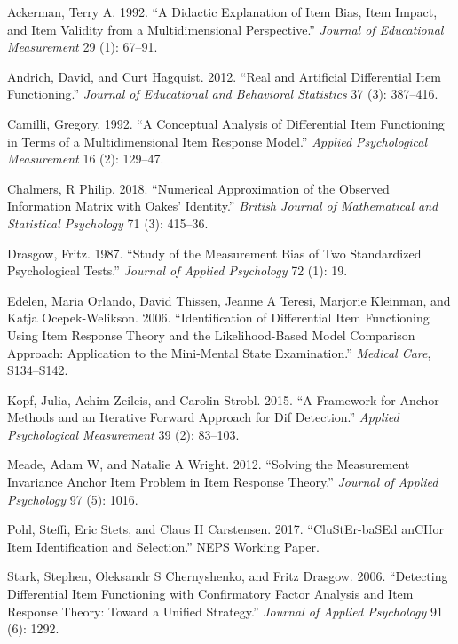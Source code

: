 \documentclass[
  11pt,
]{article}
\begin{document}
\hypertarget{refs}{}
\leavevmode\hypertarget{ref-ackerman1992didactic}{}%
Ackerman, Terry A. 1992. ``A Didactic Explanation of Item Bias, Item Impact, and Item Validity from a Multidimensional Perspective.'' \emph{Journal of Educational Measurement} 29 (1): 67--91.

\leavevmode\hypertarget{ref-andrich2012real}{}%
Andrich, David, and Curt Hagquist. 2012. ``Real and Artificial Differential Item Functioning.'' \emph{Journal of Educational and Behavioral Statistics} 37 (3): 387--416.

\leavevmode\hypertarget{ref-camilli1992conceptual}{}%
Camilli, Gregory. 1992. ``A Conceptual Analysis of Differential Item Functioning in Terms of a Multidimensional Item Response Model.'' \emph{Applied Psychological Measurement} 16 (2): 129--47.

\leavevmode\hypertarget{ref-chalmers2018numerical}{}%
Chalmers, R Philip. 2018. ``Numerical Approximation of the Observed Information Matrix with Oakes' Identity.'' \emph{British Journal of Mathematical and Statistical Psychology} 71 (3): 415--36.

\leavevmode\hypertarget{ref-drasgow1987study}{}%
Drasgow, Fritz. 1987. ``Study of the Measurement Bias of Two Standardized Psychological Tests.'' \emph{Journal of Applied Psychology} 72 (1): 19.

\leavevmode\hypertarget{ref-edelen2006identification}{}%
Edelen, Maria Orlando, David Thissen, Jeanne A Teresi, Marjorie Kleinman, and Katja Ocepek-Welikson. 2006. ``Identification of Differential Item Functioning Using Item Response Theory and the Likelihood-Based Model Comparison Approach: Application to the Mini-Mental State Examination.'' \emph{Medical Care}, S134--S142.

\leavevmode\hypertarget{ref-kopf2015framework}{}%
Kopf, Julia, Achim Zeileis, and Carolin Strobl. 2015. ``A Framework for Anchor Methods and an Iterative Forward Approach for Dif Detection.'' \emph{Applied Psychological Measurement} 39 (2): 83--103.

\leavevmode\hypertarget{ref-meade2012solving}{}%
Meade, Adam W, and Natalie A Wright. 2012. ``Solving the Measurement Invariance Anchor Item Problem in Item Response Theory.'' \emph{Journal of Applied Psychology} 97 (5): 1016.

\leavevmode\hypertarget{ref-pohl2017cluster}{}%
Pohl, Steffi, Eric Stets, and Claus H Carstensen. 2017. ``CluStEr-baSEd anCHor Item Identification and Selection.'' NEPS Working Paper.

\leavevmode\hypertarget{ref-stark2006detecting}{}%
Stark, Stephen, Oleksandr S Chernyshenko, and Fritz Drasgow. 2006. ``Detecting Differential Item Functioning with Confirmatory Factor Analysis and Item Response Theory: Toward a Unified Strategy.'' \emph{Journal of Applied Psychology} 91 (6): 1292.
\end{document}
